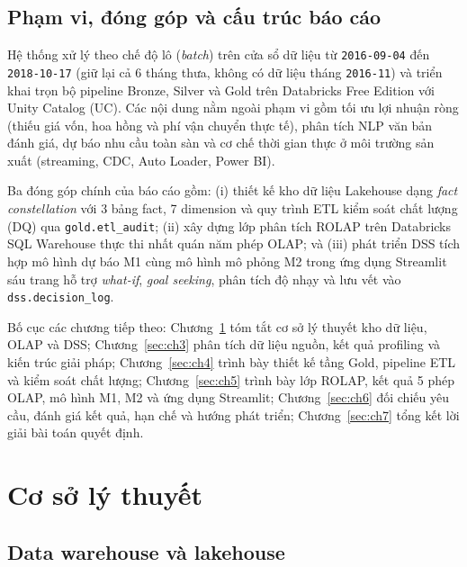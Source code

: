 \documentclass[a4paper]{article}
\begin{document}
\subsection{Phạm vi, đóng góp và cấu trúc báo cáo}
\label{subsec:1_4}

Hệ thống xử lý theo chế độ lô (\textit{batch}) trên cửa sổ dữ liệu từ \texttt{2016-09-04} đến \texttt{2018-10-17} (giữ lại cả 6 tháng thưa, không có dữ liệu tháng \texttt{2016-11}) và triển khai trọn bộ pipeline Bronze, Silver và Gold trên Databricks Free Edition với Unity Catalog (UC). Các nội dung nằm ngoài phạm vi gồm tối ưu lợi nhuận ròng (thiếu giá vốn, hoa hồng và phí vận chuyển thực tế), phân tích NLP văn bản đánh giá, dự báo nhu cầu toàn sàn và cơ chế thời gian thực ở môi trường sản xuất (streaming, CDC, Auto Loader, Power BI).

Ba đóng góp chính của báo cáo gồm: (i) thiết kế kho dữ liệu Lakehouse dạng \textit{fact constellation} với 3 bảng fact, 7 dimension và quy trình ETL kiểm soát chất lượng (DQ) qua \texttt{gold.etl\_audit}; (ii) xây dựng lớp phân tích ROLAP trên Databricks SQL Warehouse thực thi nhất quán năm phép OLAP; và (iii) phát triển DSS tích hợp mô hình dự báo M1 cùng mô hình mô phỏng M2 trong ứng dụng Streamlit sáu trang hỗ trợ \textit{what-if}, \textit{goal seeking}, phân tích độ nhạy và lưu vết vào \texttt{dss.decision\_log}.

Bố cục các chương tiếp theo: Chương~\ref{sec:ch2} tóm tắt cơ sở lý thuyết kho dữ liệu, OLAP và DSS; Chương~\ref{sec:ch3} phân tích dữ liệu nguồn, kết quả profiling và kiến trúc giải pháp; Chương~\ref{sec:ch4} trình bày thiết kế tầng Gold, pipeline ETL và kiểm soát chất lượng; Chương~\ref{sec:ch5} trình bày lớp ROLAP, kết quả 5 phép OLAP, mô hình M1, M2 và ứng dụng Streamlit; Chương~\ref{sec:ch6} đối chiếu yêu cầu, đánh giá kết quả, hạn chế và hướng phát triển; Chương~\ref{sec:ch7} tổng kết lời giải bài toán quyết định.

\section{Cơ sở lý thuyết}
\label{sec:ch2}

\subsection{Data warehouse và lakehouse}
\label{subsec:2_1}
\end{document}
